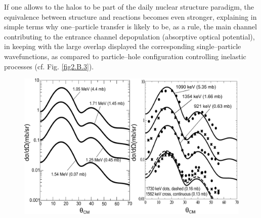 \documentclass[a4paper,11pt]{book}
\numberwithin{equation}{section}
\numberwithin{figure}{section}
\numberwithin{table}{section}
\begin{document}
If one allows to the halos to be part of the daily nuclear structure paradigm, the equivalence between structure and reactions becomes even stronger, explaining in simple terms why one--particle transfer is likely to be, as a rule, the main channel contributing to the entrance channel depopulation (absorptive optical potential), in keeping with the large overlap displayed the corresponding single--particle wavefunctions, as compared to particle--hole configuration controlling inelastic processes (cf. Fig. \ref{fig2.B.3}).
  \begin{figure}
  \centerline{\includegraphics*[width=\textwidth,angle=0]{figs_C6/cross_teor_exp.pdf}}
  \caption{}\label{fig6.2.2}
  \end{figure}
\end{document}
